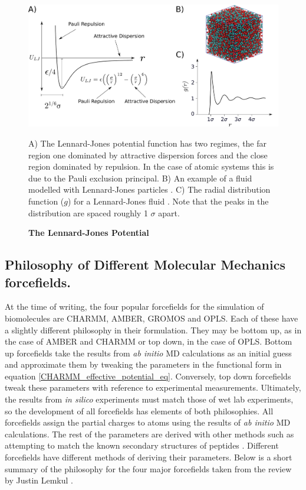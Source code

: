 \begin{figure}
	\begin{center}
		\includegraphics[width=\textwidth]{figures/LJ_figure.pdf}
	\end{center}
	\captionsetup{singlelinecheck = false, justification=raggedright}
	\caption[The Lennard-Jones Potential] {\textbf{The Lennard-Jones Potential}}{A) The Lennard-Jones potential function has two regimes, the far region one dominated by attractive dispersion forces and the close region dominated by repulsion. In the case of atomic systems this is due to the Pauli exclusion principal. B) An example of a fluid modelled with Lennard-Jones particles \cite{chari2019}. C) The radial distribution function ($g$) for a Lennard-Jones fluid \cite{morsali2005}. Note that the peaks in the distribution are spaced roughly 1 $\sigma$ apart. }
	\label{Lennard-Jones_figure}
\end{figure}

\subsection{Philosophy of Different Molecular Mechanics forcefields.}
\label{forcefields_review}
At the time of writing, the four popular forcefields for the simulation of biomolecules are CHARMM, AMBER, GROMOS and OPLS. Each of these have a slightly different philosophy in their formulation. They may be bottom up, as in the case of AMBER and CHARMM or top down, in the case of OPLS. Bottom up forcefields take the results from \textit{ab initio} MD calculations as an initial guess and approximate them by tweaking the parameters in the functional form in equation \ref{CHARMM_effective_potential_eq}. Conversely, top down forcefields tweak these parameters with reference to experimental measurements. Ultimately, the results from \textit{in silico} experiments must match those of wet lab experiments, so the development of all forcefields has elements of both philosophies. All forcefields assign the partial charges to atoms using the results of \textit{ab initio} MD calculations. The rest of the parameters are derived with other methods such as attempting to match the known secondary structures of peptides \cite{huang2017}. Different forcefields have different methods of deriving their parameters. Below is a short summary of the philosophy for the four major forcefields taken from the review by Justin Lemkul \cite{lemkul2020}. 

